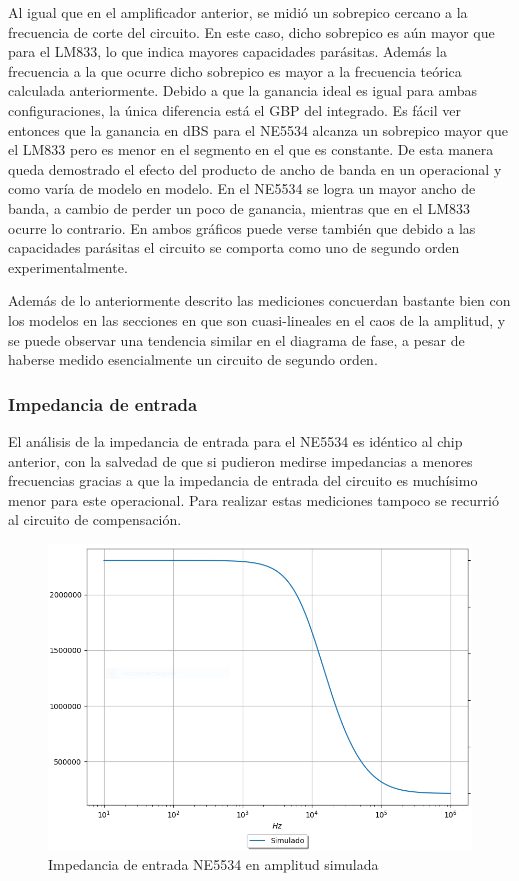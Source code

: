 Al igual que en el amplificador anterior, se midió un sobrepico cercano a la frecuencia de corte del circuito. En este caso, dicho sobrepico es aún mayor que para el LM833, lo que indica mayores capacidades parásitas. Además la frecuencia a la que ocurre dicho sobrepico es mayor a la frecuencia teórica calculada anteriormente. Debido a que la ganancia ideal es igual para ambas configuraciones, la única diferencia está el GBP del integrado. Es fácil ver entonces que la ganancia en dBS para el NE5534 alcanza un sobrepico mayor que el LM833 pero es menor en el segmento en el que es constante. De esta manera queda demostrado el efecto del producto de ancho de banda en un operacional y como varía de modelo en modelo. En el NE5534 se logra un mayor ancho de banda, a cambio de perder un poco de ganancia, mientras que en el LM833 ocurre lo contrario. En ambos gráficos puede verse también que debido a las capacidades parásitas el circuito se comporta como uno de segundo orden experimentalmente.

Además de lo anteriormente descrito las mediciones concuerdan bastante bien con los modelos en las secciones en que son cuasi-lineales en el caos de la amplitud, y se puede observar una tendencia similar en el diagrama de fase, a pesar de haberse medido esencialmente un circuito de segundo orden.

\subsubsection{Impedancia de entrada}
El análisis de la impedancia de entrada para el NE5534 es idéntico al chip anterior, con la salvedad de que si pudieron medirse impedancias a menores frecuencias gracias a que la impedancia de entrada del circuito es muchísimo menor para este operacional. Para realizar estas mediciones tampoco se recurrió al circuito de compensación.


\begin{figure}[H]	
	\centering
	\includegraphics[width=\textwidth]{Ejercicio2/Imagenes/Zin_A_NE5534_Simulado.png}
	\caption{Impedancia de entrada NE5534 en amplitud simulada}
\end{figure}

